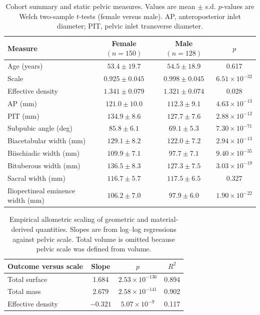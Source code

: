 \documentclass[openacc]{rsproca_new}
\begin{document}
\begin{table}[p]
\centering
\caption{Cohort summary and static pelvic measures. Values are mean $\pm$ s.d. $p$-values are Welch two-sample $t$-tests (female versus male). AP, anteroposterior inlet diameter; PIT, pelvic inlet transverse diameter.}
\label{tab:cohort}
\begin{tabular}{lccc}
\toprule
Measure & Female $(n=150)$ & Male $(n=128)$ & $p$ \\
\midrule
Age (years) & $53.4 \pm 19.7$ & $54.5 \pm 18.9$ & 0.617 \\
Scale & $0.925 \pm 0.045$ & $0.998 \pm 0.045$ & $6.51 \times 10^{-32}$ \\
Effective density & $1.341 \pm 0.079$ & $1.321 \pm 0.074$ & 0.028 \\
AP (mm) & $121.0 \pm 10.0$ & $112.3 \pm 9.1$ & $4.63 \times 10^{-13}$ \\
PIT (mm) & $134.9 \pm 8.6$ & $127.7 \pm 7.6$ & $2.88 \times 10^{-12}$ \\
Subpubic angle (deg) & $85.8 \pm 6.1$ & $69.1 \pm 5.3$ & $7.30 \times 10^{-71}$ \\
Biacetabular width (mm) & $129.1 \pm 8.2$ & $122.0 \pm 7.2$ & $2.94 \times 10^{-13}$ \\
Biischiadic width (mm) & $109.9 \pm 7.1$ & $97.7 \pm 7.1$ & $9.40 \times 10^{-35}$ \\
Bituberous width (mm) & $136.5 \pm 8.3$ & $127.3 \pm 7.5$ & $3.03 \times 10^{-19}$ \\
Sacral width (mm) & $116.7 \pm 5.7$ & $117.5 \pm 6.5$ & 0.327 \\
Iliopectineal eminence width (mm) & $106.2 \pm 7.0$ & $97.9 \pm 6.0$ & $1.90 \times 10^{-22}$ \\
\bottomrule
\end{tabular}
\end{table}

\begin{table}[p]
\centering
\caption{Empirical allometric scaling of geometric and material-derived quantities. Slopes are from log--log regressions against pelvic scale. Total volume is omitted because pelvic scale was defined from volume.}
\label{tab:allometry}
\begin{tabular}{lccc}
\toprule
Outcome versus scale & Slope & $p$ & $R^2$ \\
\midrule
Total surface & 1.684 & $2.53 \times 10^{-136}$ & 0.894 \\
Total mass & 2.679 & $2.58 \times 10^{-141}$ & 0.902 \\
Effective density & $-0.321$ & $5.07 \times 10^{-9}$ & 0.117 \\
\bottomrule
\end{tabular}
\end{table}
\end{document}
